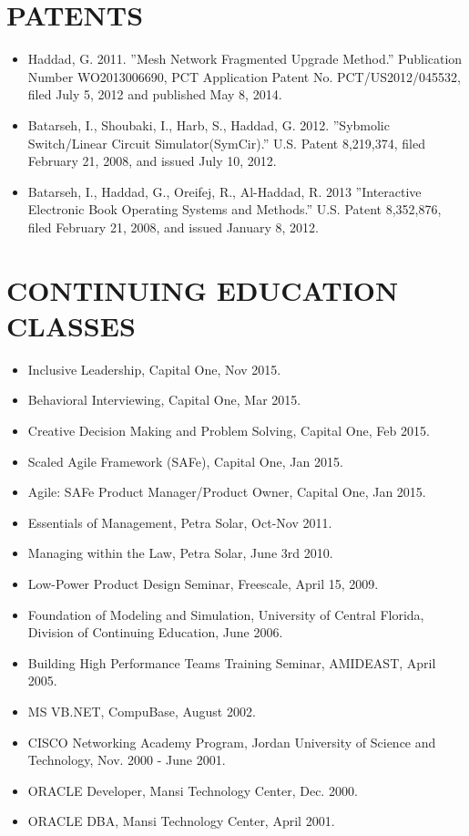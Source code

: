 \documentclass[line,margin]{res}
\begin{document}
\begin{resume}
\section{PATENTS}
\begin{itemize} \itemsep -2pt
     \item Haddad, G. 2011. ''Mesh Network Fragmented Upgrade Method.''
     Publication Number WO2013006690, PCT Application Patent No. 
     PCT/US2012/045532, filed July 5, 2012 and published May 8, 2014. 
     \item Batarseh, I., Shoubaki, I., Harb, S., Haddad, G. 2012. ''Sybmolic
     Switch/Linear Circuit Simulator(SymCir).'' U.S. Patent 8,219,374, filed 
     February 21, 2008, and issued July 10, 2012.
     \item Batarseh, I., Haddad, G., Oreifej, R., Al-Haddad, R. 2013
     ''Interactive Electronic Book Operating Systems and Methods.''
     U.S. Patent 8,352,876, filed February 21, 2008, and issued January 8,
     2012.
\end{itemize} 

\section{CONTINUING EDUCATION CLASSES}
\begin{itemize} \itemsep -2pt
     \item Inclusive Leadership, Capital One, Nov 2015.
     \item Behavioral Interviewing, Capital One, Mar 2015.
     \item Creative Decision Making and Problem Solving, Capital One, Feb 2015.
     \item Scaled Agile Framework (SAFe), Capital One, Jan 2015.
     \item Agile: SAFe Product Manager/Product Owner, Capital One, Jan 2015.
     \item Essentials of Management, Petra Solar, Oct-Nov 2011.
     \item Managing within the Law, Petra Solar, June 3rd 2010.
     \item Low-Power Product Design Seminar, Freescale, April 15, 2009.
     \item Foundation of Modeling and Simulation, University of Central
     Florida, Division of Continuing Education, June 2006.
     \item Building High Performance Teams Training Seminar, AMIDEAST, April
     2005.
     \item MS VB.NET, CompuBase, August 2002.
     \item CISCO Networking Academy Program, Jordan University of Science and
     Technology, Nov. 2000 - June 2001.
     \item ORACLE Developer, Mansi Technology Center, Dec. 2000.
     \item ORACLE DBA, Mansi Technology Center, April 2001.
\end{itemize} 


\end{resume}
\end{document}
